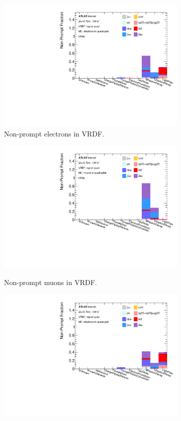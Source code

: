 \begin{figure}[htb]
	\centering
    \begin{subfigure}{.48\textwidth}
        \centering
        \includegraphics[width=.9\linewidth]{figures/Analysis/Background/NonPromptCRDFSignal_Electronss_bVeto.pdf}
        \caption{Non-prompt electrons in VRDF.}
    \end{subfigure}
    \begin{subfigure}{.48\textwidth}
        \centering
        \includegraphics[width=.9\linewidth]{figures/Analysis/Background/NonPromptCRDFSignal_Muons_bVeto.pdf}\\
        \caption{Non-prompt muons in VRDF.}
    \end{subfigure}
    \begin{subfigure}{.48\textwidth}
        \centering
	    \includegraphics[width=.9\linewidth]{figures/Analysis/Background/NonPromptCRSCSignal_Electrons_.pdf}

\end{subfigure}
\end{figure}
